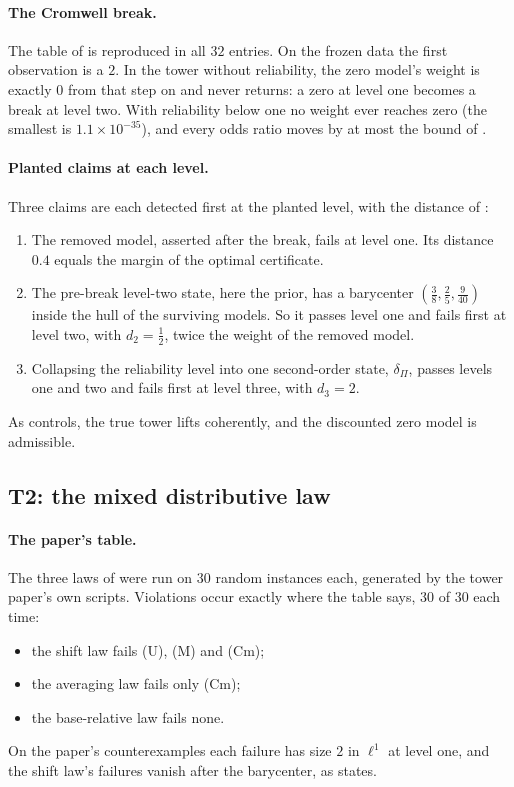 \documentclass[11pt]{article}
\theoremstyle{definition}
\theoremstyle{remark}
\begin{document}
\paragraph{The Cromwell break.} The table of \cite[Ex.~9.1]{Bands} is reproduced in all $32$ entries. On the frozen data the first
observation is a $2$. In the tower without reliability, the zero model's weight is exactly $0$ from that step on and never returns: a
zero at level one becomes a break at level two. With reliability below one no weight ever reaches zero (the smallest is
$1.1\times10^{-35}$), and every odds ratio moves by at most the bound of \cite[Prop.~9.2]{Bands}.

\paragraph{Planted claims at each level.} Three claims are each detected first at the planted level, with the distance of
\cite[Thm.~10.8, Prop.~10.9]{Tower}:
\begin{enumerate}[leftmargin=*,nosep]
\item The removed model, asserted after the break, fails at level one. Its distance $0.4$ equals the margin of the optimal certificate.
\item The pre-break level-two state, here the prior, has a barycenter $(\frac38,\frac25,\frac9{40})$ inside the hull of the surviving
  models. So it passes level one and fails first at level two, with $d_2=\frac12$, twice the weight of the removed model.
\item Collapsing the reliability level into one second-order state, $\delta_\Pi$, passes levels one and two and fails first at level
  three, with $d_3=2$.
\end{enumerate}
As controls, the true tower lifts coherently, and the discounted zero model is admissible.

\subsection{T2: the mixed distributive law}

\paragraph{The paper's table.} The three laws of \cite[Table~2]{Tower} were run on $30$ random instances each, generated by the tower
paper's own scripts. Violations occur exactly where the table says, $30$ of $30$ each time:
\begin{itemize}[leftmargin=*,nosep]
\item the shift law fails (U), (M) and (Cm);
\item the averaging law fails only (Cm);
\item the base-relative law fails none.
\end{itemize}
On the paper's counterexamples each failure has size $2$ in $\ell^1$ at level one, and the shift law's failures vanish after the
barycenter, as \cite[Thm.~8.3]{Tower} states.
\end{document}
